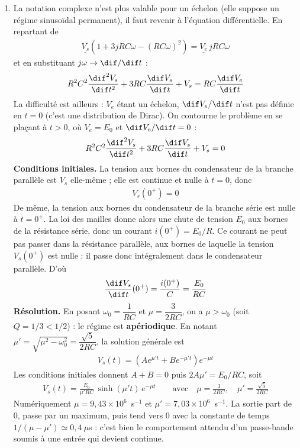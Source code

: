 \begin{correction}
\begin{enumerate}
	\item La notation complexe n'est plus valable pour un échelon (elle suppose un régime sinusoïdal permanent), il faut revenir à l'équation différentielle. En repartant de
	\begin{align*}
		\underline{V_s}\left(1+3jRC\omega-(RC\omega)^2\right)=\underline{V_e}\,jRC\omega
	\end{align*}
	et en substituant $j\omega\rightarrow\dif/\dif t$ :
	\begin{align*}
		R^2C^2\frac{\dif^2V_s}{\dif t^2}+3RC\frac{\dif V_s}{\dif t}+V_s=RC\frac{\dif V_e}{\dif t}
	\end{align*}
	La difficulté est ailleurs : $V_e$ étant un échelon, $\dif V_e/\dif t$ n'est pas définie en $t=0$ (c'est une distribution de Dirac). On contourne le problème en se plaçant à $t>0$, où $V_e=E_0$ et $\dif V_e/\dif t=0$ :
	\begin{align*}
		R^2C^2\frac{\dif^2V_s}{\dif t^2}+3RC\frac{\dif V_s}{\dif t}+V_s=0
	\end{align*}
	\textbf{Conditions initiales.} La tension aux bornes du condensateur de la branche parallèle est $V_s$ elle-même ; elle est continue et nulle à $t=0$, donc
	\begin{align*}
		V_s(0^+)=0
	\end{align*}
	De même, la tension aux bornes du condensateur de la branche série est nulle à $t=0^+$. La loi des mailles donne alors une chute de tension $E_0$ aux bornes de la résistance série, donc un courant $i(0^+)=E_0/R$. Ce courant ne peut pas passer dans la résistance parallèle, aux bornes de laquelle la tension $V_s(0^+)$ est nulle : il passe donc intégralement dans le condensateur parallèle. D'où
	\begin{align*}
		\frac{\dif V_s}{\dif t}(0^+)=\frac{i(0^+)}{C}=\frac{E_0}{RC}
	\end{align*}
	\textbf{Résolution.} En posant $\omega_0=\dfrac{1}{RC}$ et $\mu=\dfrac{3}{2RC}$, on a $\mu>\omega_0$ (soit $Q=1/3<1/2$) : le régime est \textbf{apériodique}. En notant $\mu'=\sqrt{\mu^2-\omega_0^2}=\dfrac{\sqrt5}{2RC}$, la solution générale est
	\begin{align*}
		V_s(t)=\left(Ae^{\mu' t}+Be^{-\mu' t}\right)e^{-\mu t}
	\end{align*}
	Les conditions initiales donnent $A+B=0$ puis $2A\mu'=E_0/RC$, soit
	\begin{align*}
		\boxed{V_s(t)=\frac{E_0}{\mu' RC}\,\sinh(\mu' t)\,e^{-\mu t}}
		\qquad\text{avec}\quad \mu=\frac{3}{2RC},\quad \mu'=\frac{\sqrt5}{2RC}
	\end{align*}
	Numériquement $\mu=9,43\times10^{6}$~s$^{-1}$ et $\mu'=7,03\times10^{6}$~s$^{-1}$. La sortie part de $0$, passe par un maximum, puis tend vers $0$ avec la constante de temps $1/(\mu-\mu')\simeq0,4~\mu$s : c'est bien le comportement attendu d'un passe-bande soumis à une entrée qui devient continue.

\end{enumerate}

\end{correction}


